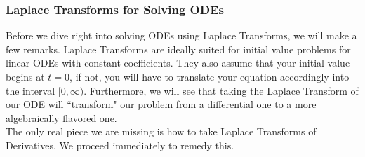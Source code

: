 %
%
%
%
\subsubsection{Laplace Transforms for Solving ODEs}

Before we dive right into solving ODEs using Laplace Transforms, we will make a few remarks. Laplace Transforms are ideally suited for initial value problems for linear ODEs with constant coefficients. They also assume that your initial value begins at $t=0$, if not, you will have to translate your equation accordingly into the interval $[0,\infty)$. Furthermore, we will see that taking the Laplace Transform of our ODE will ``transform" our problem from a differential one to a more algebraically flavored one.  \\

The only real piece we are missing is how to take Laplace Transforms of Derivatives. We proceed immediately to remedy this. 

